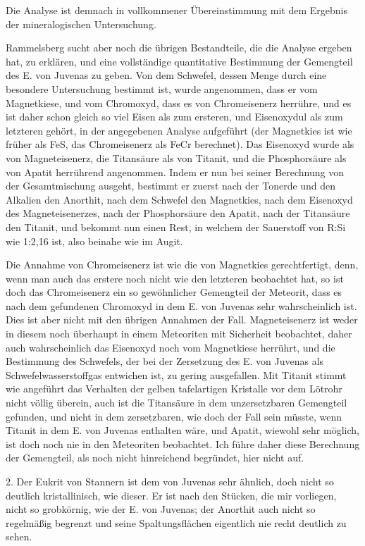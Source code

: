 \documentclass[a4paper, 11pt, oneside]{article}
\begin{document}
Die Analyse ist demnach in vollkommener Übereinstimmung mit dem Ergebnis der mineralogischen Untersuchung.

Rammelsberg sucht aber noch die übrigen Bestandteile, die die Analyse ergeben hat, zu erklären, und eine vollständige quantitative Bestimmung der Gemengteil des E. von Juvenas zu geben. Von dem Schwefel, dessen Menge durch eine besondere Untersuchung bestimmt ist, wurde angenommen, dass er vom Magnetkiese, und vom Chromoxyd, dass es von Chromeisenerz herrühre, und es ist daher schon gleich so viel Eisen als zum ersteren, und Eisenoxydul als zum letzteren gehört, in der angegebenen Analyse aufgeführt (der Magnetkies ist wie früher als FeS, das Chromeisenerz als FeCr berechnet). Das Eisenoxyd wurde als von Magneteisenerz, die Titansäure als von Titanit, und die Phosphorsäure als von Apatit herrührend angenommen. Indem er nun bei seiner Berechnung von der Gesamtmischung ausgeht, bestimmt er zuerst nach der Tonerde und den Alkalien den Anorthit, nach dem Schwefel den Magnetkies, nach dem Eisenoxyd des Magneteisenerzes, nach der Phosphorsäure den Apatit, nach der Titansäure den Titanit, und bekommt nun einen Rest, in welchem der Sauerstoff von R:Si wie 1:2,16 ist, also beinahe wie im Augit.

Die Annahme von Chromeisenerz ist wie die von Magnetkies gerechtfertigt, denn, wenn man auch das erstere noch nicht wie den letzteren beobachtet hat, so ist doch das Chromeisenerz ein so gewöhnlicher Gemengteil der Meteorit, dass es nach dem gefundenen Chromoxyd in dem E. von Juvenas sehr wahrscheinlich ist. Dies ist aber nicht mit den übrigen Annahmen der Fall. Magneteisenerz ist weder in diesem noch überhaupt in einem Meteoriten mit Sicherheit beobachtet, daher auch wahrscheinlich das Eisenoxyd noch vom Magnetkiese herrührt, und die Bestimmung des Schwefels, der bei der Zersetzung des E. von Juvenas als Schwefelwasserstoffgas entwichen ist, zu gering ausgefallen. Mit Titanit stimmt wie angeführt das Verhalten der gelben tafelartigen Kristalle vor dem Lötrohr nicht völlig überein, auch ist die Titansäure in dem unzersetzbaren Gemengteil gefunden, und nicht in dem zersetzbaren, wie doch der Fall sein müsste, wenn Titanit in dem E. von Juvenas enthalten wäre, und Apatit, wiewohl sehr möglich, ist doch noch nie in den Meteoriten beobachtet. Ich führe daher diese Berechnung der Gemengteil, als noch nicht hinreichend begründet, hier nicht auf.

2. Der Eukrit von Stannern ist dem von Juvenas sehr ähnlich, doch nicht so deutlich kristallinisch, wie dieser. Er ist nach den Stücken, die mir vorliegen, nicht so grobkörnig, wie der E. von Juvenas; der Anorthit auch nicht so regelmäßig begrenzt und seine Spaltungsflächen eigentlich nie recht deutlich zu sehen.
\end{document}
